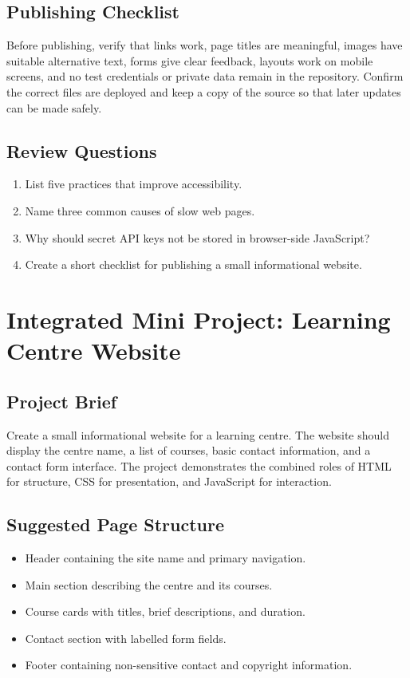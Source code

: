\documentclass[11pt,openany,oneside]{book}
\begin{document}
\section{Publishing Checklist}
Before publishing, verify that links work, page titles are meaningful, images have suitable alternative text, forms give clear feedback, layouts work on mobile screens, and no test credentials or private data remain in the repository. Confirm the correct files are deployed and keep a copy of the source so that later updates can be made safely.

\section*{Review Questions}
\begin{enumerate}
\item List five practices that improve accessibility.
\item Name three common causes of slow web pages.
\item Why should secret API keys not be stored in browser-side JavaScript?
\item Create a short checklist for publishing a small informational website.
\end{enumerate}

\chapter{Integrated Mini Project: Learning Centre Website}
\section{Project Brief}
Create a small informational website for a learning centre. The website should display the centre name, a list of courses, basic contact information, and a contact form interface. The project demonstrates the combined roles of HTML for structure, CSS for presentation, and JavaScript for interaction.

\section{Suggested Page Structure}
\begin{itemize}
\item Header containing the site name and primary navigation.
\item Main section describing the centre and its courses.
\item Course cards with titles, brief descriptions, and duration.
\item Contact section with labelled form fields.
\item Footer containing non-sensitive contact and copyright information.
\end{itemize}
\end{document}

